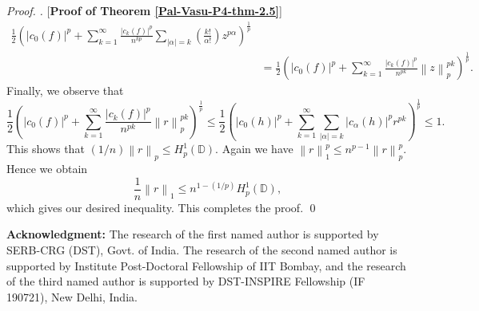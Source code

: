 \documentclass[a4paper,12pt]{amsart}
\theoremstyle{definition}
\newenvironment{pf}[1][]{%
 \vskip 3mm
 \noindent
 \ifthenelse{\equal{#1}{}}%
  {{\slshape Proof. }}%
  {{\slshape #1.} }%
 }%
{\qed\bigskip}
\newcommand{\norm}[1]{\left\lVert#1\right\rVert}
\begin{document}
\begin{pf} [{\bf Proof of Theorem \ref{Pal-Vasu-P4-thm-2.5}}]
\begin{align*}
		\frac{1}{2}\left(|c_0(f)|^p+ \sum_{k=1}^{\infty}\frac{|c_k(f)|^p}{n^{kp}}\sum_{|\alpha|=k}\left(\frac{k!}{\alpha!}\right)z^{p\alpha}\right)^{\frac{1}{p}}\\[2mm]& = 
		\frac{1}{2}\left(|c_0(f)|^p + \sum_{k=1}^{\infty}\frac{|c_k(f)|^p}{n^{pk}}\norm{z}^{pk}_{p}\right)^{\frac{1}{p}}.
	\end{align*}
	Finally, we observe that
	\begin{equation*}
		\frac{1}{2}\left(|c_0(f)|^p + \sum_{k=1}^{\infty}\frac{|c_k(f)|^p}{n^{pk}}\norm{r}^{pk}_{p}\right)^{\frac{1}{p}}\leq \frac{1}{2}\left(|c_0(h)|^p + \sum_{k=1}^{\infty}\sum_{|\alpha|=k}|c_{\alpha}(h)|^pr^{pk}\right)^{\frac{1}{p}}\leq 1.
	\end{equation*}
	This shows that $(1/n)\norm{r}_p\leq H^1_{p}(\mathbb{D}).$ Again we have $\norm{r}^p_{1}\leq n^{p-1}\norm{r}^p_{p}.$ Hence we obtain
	\begin{equation*}
		\frac{1}{n}\norm{r}_1\leq n^{1-(1/p)}H^1_{p}(\mathbb{D}),
	\end{equation*}
which gives our desired inequality. This completes the proof.
\end{pf}

\noindent\textbf{Acknowledgment:} 
The research of the first named author is supported by SERB-CRG (DST), Govt. of India.  The research of the second named author is supported by Institute Post-Doctoral Fellowship of IIT Bombay, and the research of the third named author is supported by DST-INSPIRE Fellowship (IF 190721),  New Delhi, India.
\end{document}
